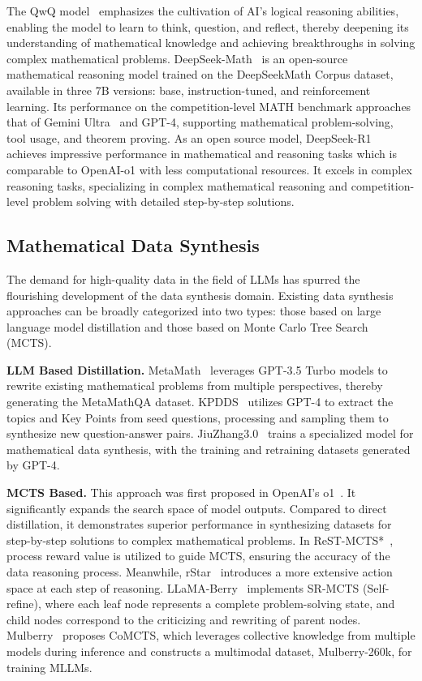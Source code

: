 The QwQ model~\cite{qwq-32b-preview} emphasizes the cultivation of AI's logical reasoning abilities, enabling the model to learn to think, question, and reflect, thereby deepening its understanding of mathematical knowledge and achieving breakthroughs in solving complex mathematical problems. DeepSeek-Math~\cite{shao2024deepseekmath} is an open-source mathematical reasoning model trained on the DeepSeekMath Corpus dataset, available in three 7B versions: base, instruction-tuned, and reinforcement learning. Its performance on the competition-level MATH benchmark approaches that of Gemini Ultra~\cite{team2023gemini} and GPT-4, supporting mathematical problem-solving, tool usage, and theorem proving.
As an open source model, DeepSeek-R1~\cite{guo2025deepseek} achieves impressive performance in mathematical and reasoning tasks which is comparable to OpenAI-o1 with less computational resources. It excels in complex reasoning tasks, specializing in complex mathematical reasoning and competition-level problem solving with detailed step-by-step solutions.

\subsection{Mathematical Data Synthesis}

The demand for high-quality data in the field of LLMs has spurred the flourishing development of the data synthesis domain. Existing data synthesis approaches can be broadly categorized into two types: those based on large language model distillation and those based on Monte Carlo Tree Search (MCTS).

\textbf{LLM Based Distillation.} MetaMath~\cite{yu2023metamath} leverages GPT-3.5 Turbo models to rewrite existing mathematical problems from multiple perspectives, thereby generating the  MetaMathQA dataset. KPDDS~\cite{huang2024key} utilizes GPT-4 to extract the topics and Key Points from seed questions, processing and sampling them to synthesize new question-answer pairs. JiuZhang3.0~\cite{huang2024key} trains a specialized model for mathematical data synthesis, with the training and retraining datasets generated by GPT-4.

\textbf{MCTS Based.} This approach was first proposed in OpenAI's o1~\cite{chatgpt}. It significantly expands the search space of model outputs. Compared to direct distillation, it demonstrates superior performance in synthesizing datasets for step-by-step solutions to complex mathematical problems. In ReST-MCTS*~\cite{zhang2024rest}, process reward value is utilized to guide MCTS, ensuring the accuracy of the data reasoning process. Meanwhile, rStar~\cite{qi2024mutual} introduces a more extensive action space at each step of reasoning. LLaMA-Berry~\cite{zhang2024llama} implements SR-MCTS (Self-refine), where each leaf node represents a complete problem-solving state, and child nodes correspond to the criticizing and rewriting of parent nodes. Mulberry~\cite{yao2024mulberry} proposes CoMCTS, which leverages collective knowledge from multiple models during inference and constructs a multimodal dataset, Mulberry-260k, for training MLLMs.

